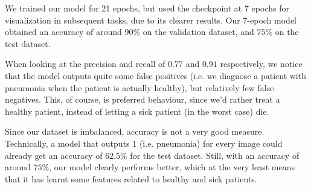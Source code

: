 We trained our model for 21 epochs, but used the checkpoint at 7 epochs for visualization in subsequent tasks, due to its clearer results.
Our 7-epoch model obtained an accuracy of around $90\%$ on the validation dataset, and $75\%$ on the test dataset.

When looking at the precision and recall of $0.77$ and $0.91$ respectively, we notice that the model outputs quite some false positives (i.e. we diagnose a patient with pneumonia when the patient is actually healthy), but relatively few false negatives. This, of course, is preferred behaviour, since we'd rather treat a healthy patient, instead of letting a sick patient (in the worst case) die.

Since our dataset is imbalanced, accuracy is not a very good measure. Technically, a model that outputs 1 (i.e. pneumonia) for every image could already get an accuracy of $62.5\%$ for the test dataset. Still, with an accuracy of around $75\%$, our model clearly performs better, which at the very least means that it has learnt some features related to healthy and sick patients.
